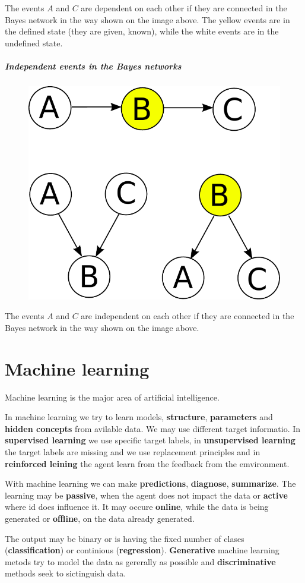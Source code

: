 \documentclass[a4paper,10pt]{article}
\begin{document}
The events $A$ and $C$ are dependent on each other if they are connected in the Bayes network in the way shown on the image above. The yellow events are in the defined state (they are given, known), while the white events are in the undefined state.

\newpage

\subsubsection*{Independent events in the Bayes networks}

\begin{figure}[h!]
\centering
\includegraphics[height=0.3\textwidth]{InactiveTriplet.pdf}
\end{figure}

The events $A$ and $C$ are independent on each other if they are connected in the Bayes network in the way shown on the image above.

\part*{Machine learning}

Machine learning is the major area of artificial intelligence.

In machine learning we try to learn models, \textbf{structure}, \textbf{parameters} and \textbf{hidden concepts} from avilable data. We may use different target informatio. In \textbf{supervised learning} we use specific target labels, in \textbf{unsupervised learning} the target labels are missing and we use replacement principles and in \textbf{reinforced leining} the agent learn from the feedback from the emvironment. 

With machine learning we can make \textbf{predictions}, \textbf{diagnose}, \textbf{summarize}. The learning may be \textbf{passive}, when the agent does not impact the data or \textbf{active} where id does influence it. It may occure \textbf{online}, while the data is being generated or \textbf{offline}, on the data already generated.

The output may be binary or is having the fixed number of clases (\textbf{classification}) or continious (\textbf{regression}). \textbf{Generative} machine learning metods try to model the data as gererally as possible and \textbf{discriminative} methods seek to sictinguish data.
\end{document}
